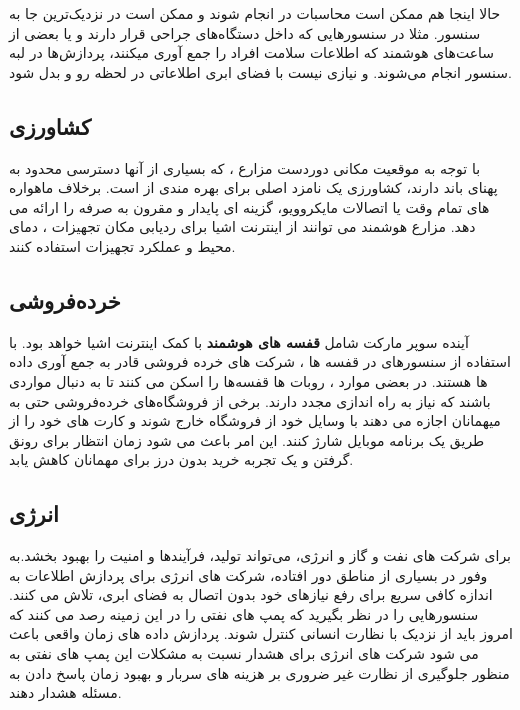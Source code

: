 حالا اینجا هم ممکن است محاسبات در   انجام شوند و ممکن است در نزدیک‌ترین جا به سنسور.
مثلا در سنسورهایی که داخل دستگاه‌های جراحی قرار دارند و یا بعضی از ساعت‌های هوشمند که اطلاعات سلامت افراد را جمع آوری میکنند، پردازش‌ها در لبه سنسور انجام می‌شوند. و نیازی نیست با فضای ابری اطلاعاتی در لحظه رو و بدل شود.
\subsection{کشاورزی}
با توجه به موقعیت مکانی دوردست مزارع ، که بسیاری از آنها دسترسی محدود به پهنای باند دارند، کشاورزی یک نامزد اصلی برای بهره مندی از  است. برخلاف ماهواره های تمام وقت یا اتصالات مایکروویو،   گزینه ای پایدار و مقرون به صرفه را ارائه می دهد. مزارع هوشمند می توانند از اینترنت اشیا برای ردیابی مکان تجهیزات ، دمای محیط و عملکرد تجهیزات استفاده کنند.

\subsection{خرده‌فروشی}
آینده سوپر مارکت شامل \textbf{قفسه های هوشمند} با کمک اینترنت اشیا خواهد بود. با استفاده از سنسورهای  در قفسه ها ، شرکت های خرده فروشی قادر به جمع آوری داده ها هستند. در بعضی موارد ، روبات ها قفسه‌ها را اسکن می کنند تا به دنبال مواردی باشند که نیاز به راه اندازی مجدد دارند. برخی از فروشگاه‌های خرده‌فروشی حتی به میهمانان اجازه می دهند با وسایل خود از فروشگاه خارج شوند و کارت های خود را از طریق یک برنامه موبایل شارژ کنند. این امر باعث می شود زمان انتظار برای رونق گرفتن و یک تجربه خرید بدون درز برای مهمانان کاهش یابد.
\subsection{انرژی}
برای شرکت های نفت و گاز و انرژی،  می‌تواند تولید، فرآیندها و امنیت را بهبود بخشد.به وفور در بسیاری از مناطق دور افتاده، شرکت های انرژی برای پردازش اطلاعات به اندازه کافی سریع برای رفع نیازهای خود بدون اتصال به فضای ابری، تلاش می کنند. سنسورهایی را در نظر بگیرید که پمپ های نفتی را در این زمینه رصد می کنند که امروز باید از نزدیک با نظارت انسانی کنترل شوند. پردازش داده های زمان واقعی باعث می شود شرکت های انرژی برای هشدار نسبت به مشکلات این پمپ های نفتی به منظور جلوگیری از نظارت غیر ضروری بر هزینه های سربار و بهبود زمان پاسخ دادن به مسئله هشدار دهند.
